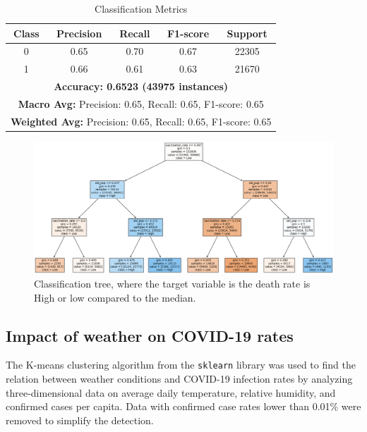\documentclass[sigconf,screen,nonacm]{acmart}
\begin{document}
\begin{table}[h]
\centering
\caption{Classification Metrics}
\begin{tabular}{|c|c|c|c|c|}
\hline
\textbf{Class} & \textbf{Precision} & \textbf{Recall} & \textbf{F1-score} & \textbf{Support} \\ \hline
0              & 0.65               & 0.70            & 0.67              & 22305            \\ \hline
1              & 0.66               & 0.61            & 0.63              & 21670            \\ \hline
\multicolumn{5}{|c|}{\textbf{Accuracy: 0.6523 (43975 instances)}}                         \\ \hline
\multicolumn{5}{|c|}{\textbf{Macro Avg:} Precision: 0.65, Recall: 0.65, F1-score: 0.65}  \\ \hline
\multicolumn{5}{|c|}{\textbf{Weighted Avg:} Precision: 0.65, Recall: 0.65, F1-score: 0.65} \\ \hline
\end{tabular}
\label{Table:Corr-results}
\end{table}


\begin{figure}[h]
  \centering
  \includegraphics[width=\linewidth]{Figures/tree_high_res.png}
  \caption{Classification tree, where the target variable is the death rate is High or low compared to the median.}
  \label{fig:decision-tree}
\end{figure}


\subsection{Impact of weather on COVID-19 rates}

The K-means clustering algorithm from the \texttt{sklearn} library was used to find the relation between weather conditions and COVID-19 infection rates by analyzing three-dimensional data on average daily temperature, relative humidity, and confirmed cases per capita. Data with confirmed case rates lower than 0.01\% were removed to simplify the detection. 
\end{document}
